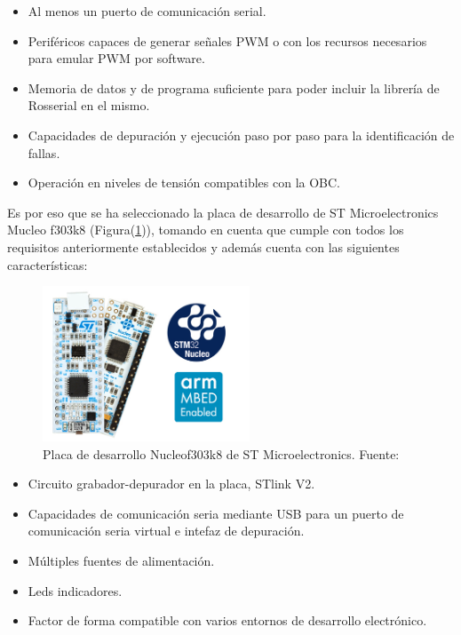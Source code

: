     \begin{itemize}
        \item Al menos un puerto de comunicación serial.
        \item Periféricos capaces de generar señales PWM o con los recursos necesarios para emular PWM por software.
        \item Memoria de datos y de programa suficiente para poder incluir la librería de Rosserial en el mismo.
        \item Capacidades de depuración y ejecución paso por paso para la identificación de fallas.
        \item Operación en niveles de tensión compatibles con la OBC.
    \end{itemize}

    Es por eso que se ha seleccionado la placa de desarrollo de ST Microelectronics Mucleo f303k8 (Figura(\ref{fig:nucleo})), tomando en cuenta 
    que cumple con todos los requisitos anteriormente establecidos y además cuenta con las siguientes características:


    \begin{figure}[!h] 
        \centering
        \includegraphics[width=0.55\textwidth]{img/nucleo}
        \caption[Placa de desarrollo Nucleof303k8 de ST Microelectronics]{Placa de desarrollo Nucleof303k8 de ST Microelectronics. Fuente: \cite{nucleof303} }
        \label{fig:nucleo}
    \end{figure}


    \begin{itemize}
        \item Circuito grabador-depurador en la placa, STlink V2.
        \item Capacidades de comunicación seria mediante USB para un puerto de comunicación seria virtual e intefaz de depuración.
        \item Múltiples fuentes de alimentación.
        \item Leds indicadores.
        \item Factor de forma compatible con varios entornos de desarrollo electrónico.
    \end{itemize}


